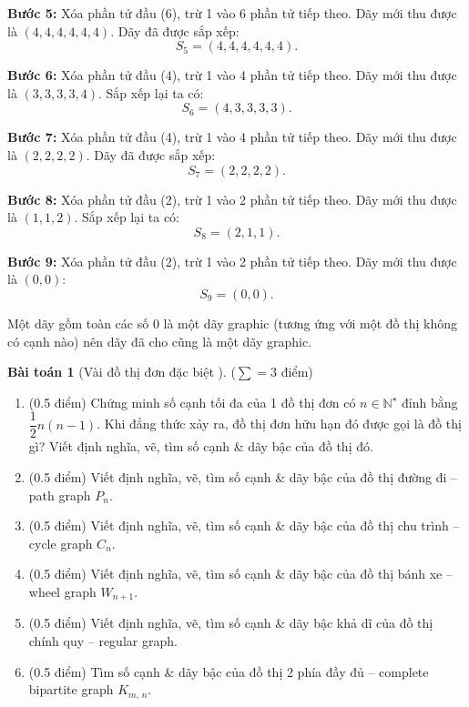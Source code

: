 \documentclass[a4paper, 11pt]{article}
\theoremstyle{definition}
\newtheorem{baitoan}{Bài toán}
\begin{document}
\begin{enumerate}[label=(\alph*)]
			\textbf{Bước 5:} Xóa phần tử đầu (6), trừ 1 vào 6 phần tử tiếp theo. Dãy mới thu được là $(4, 4, 4, 4, 4, 4)$. Dãy đã được sắp xếp:
			$$S_5 = (4, 4, 4, 4, 4, 4).$$

			\textbf{Bước 6:} Xóa phần tử đầu (4), trừ 1 vào 4 phần tử tiếp theo. Dãy mới thu được là $(3, 3, 3, 3, 4)$. Sắp xếp lại ta có:
			$$S_6 = (4, 3, 3, 3, 3).$$

			\textbf{Bước 7:} Xóa phần tử đầu (4), trừ 1 vào 4 phần tử tiếp theo. Dãy mới thu được là $(2, 2, 2, 2)$. Dãy đã được sắp xếp:
			$$S_7 = (2, 2, 2, 2).$$

			\textbf{Bước 8:} Xóa phần tử đầu (2), trừ 1 vào 2 phần tử tiếp theo. Dãy mới thu được là $(1, 1, 2)$. Sắp xếp lại ta có:
			$$S_8 = (2, 1, 1).$$

			\textbf{Bước 9:} Xóa phần tử đầu (2), trừ 1 vào 2 phần tử tiếp theo. Dãy mới thu được là $(0, 0)$:
			$$S_9 = (0, 0).$$

			Một dãy gồm toàn các số 0 là một dãy graphic (tương ứng với một đồ thị không có cạnh nào) nên dãy đã cho cũng là một dãy graphic.
	\end{enumerate}

	\begin{tcolorbox}[breakable]
    	\begin{baitoan}[Vài đồ thị đơn đặc biệt \cite{valiente2002algorithms}]
			($\sum = 3$ điểm)
			\begin{enumerate}[label=(\alph*)]
				\item (0.5 điểm) Chứng minh số cạnh tối đa của 1 đồ thị đơn có $n\in\mathbb{N}^\star$ đỉnh bằng $\dfrac{1}{2}n(n - 1)$. Khi đẳng thức xảy ra, đồ thị đơn hữu hạn đó được gọi là đồ thị gì? Viết định nghĩa, vẽ, tìm số cạnh \& dãy bậc của đồ thị đó.
				\item (0.5 điểm) Viết định nghĩa, vẽ, tìm số cạnh \& dãy bậc của đồ thị đường đi -- path graph $P_n$.
				\item (0.5 điểm) Viết định nghĩa, vẽ, tìm số cạnh \& dãy bậc của đồ thị chu trình -- cycle graph $C_n$.
				\item (0.5 điểm) Viết định nghĩa, vẽ, tìm số cạnh \& dãy bậc của đồ thị bánh xe -- wheel graph $W_{n+1}$.
				\item (0.5 điểm) Viết định nghĩa, vẽ, tìm số cạnh \& dãy bậc khả dĩ của đồ thị chính quy -- regular graph.
				\item (0.5 điểm) Tìm số cạnh \& dãy bậc của đồ thị 2 phía đầy đủ -- complete bipartite graph $K_{m,\,n}$.
			\end{enumerate}
		\end{baitoan}
	\end{tcolorbox}
\end{document}
